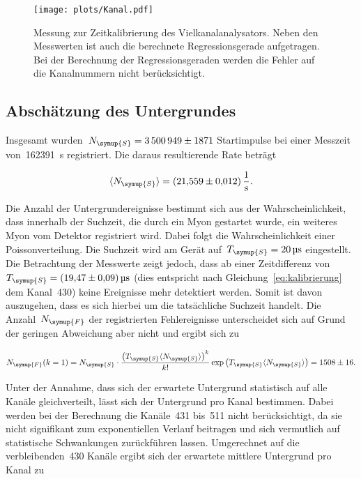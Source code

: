 \begin{figure}[htb]
  \centering
  \texttt{[image: plots/Kanal.pdf]}
  \caption{Messung zur Zeitkalibrierung des Vielkanalanalysators. Neben den
  Messwerten ist auch die berechnete Regressionsgerade aufgetragen. Bei der
  Berechnung der Regressionsgeraden werden die Fehler auf die Kanalnummern nicht
  berücksichtigt.}
  \label{fig:kalibrierung}
\end{figure}

\subsection{Abschätzung des Untergrundes}
Insgesamt wurden~$N_{\symup{S}}=\num{3500949(1871)}$ Startimpulse bei einer
Messzeit von~\SI{162391}{\second} registriert. Die daraus resultierende Rate
beträgt

\begin{equation}
  \langle N_{\symup{S}}\rangle=\SI{21.559(12)}{\per\second}.
  \label{eq:rate_start}
\end{equation}

Die Anzahl der Untergrundereignisse bestimmt sich aus der Wahrscheinlichkeit,
dass innerhalb der Suchzeit, die durch ein Myon gestartet wurde, ein weiteres
Myon vom Detektor registriert wird. Dabei folgt die Wahrscheinlichkeit einer
Poissonverteilung. Die Suchzeit wird am Gerät
auf~$T_{\symup{S}}=\SI{20}{\micro\second}$ eingestellt. Die Betrachtung der
Messwerte zeigt jedoch, dass ab einer Zeitdifferenz
von~$T_{\symup{S}}=\SI{19.47(9)}{\micro\second}$ (dies entspricht nach
Gleichung~\eqref{eq:kalibrierung} dem Kanal~\num{430}) keine Ereignisse mehr
detektiert werden. Somit ist davon auszugehen, dass es sich hierbei um die
tatsächliche Suchzeit handelt. Die Anzahl~$N_{\symup{F}}$ der registrierten
Fehlereignisse unterscheidet sich auf Grund der geringen Abweichung aber nicht und
ergibt sich zu

\begin{equation}
  N_{\symup{F}}(k=1)=N_{\symup{S}}\cdot\frac{\left(T_{\symup{S}}\langle N_{\symup{S}}\rangle\right)^k}{k!}\exp\left(T_{\symup{S}}\langle N_{\symup{S}}\rangle\right)=\num{1508(16)}.
  \label{eq:untergrund_gesamt}
\end{equation}

Unter der Annahme, dass sich der erwartete Untergrund statistisch auf alle
Kanäle gleichverteilt, lässt sich der Untergrund pro Kanal bestimmen. Dabei
werden bei der Berechnung die Kanäle~\num{431} bis~\num{511} nicht berücksichtigt,
da sie nicht signifikant zum exponentiellen Verlauf beitragen und sich vermutlich
auf statistische Schwankungen zurückführen lassen. Umgerechnet auf die verbleibenden~\num{430} Kanäle
ergibt sich der erwartete mittlere Untergrund pro Kanal zu

